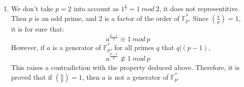 \documentclass[12pt, a4paper]{article}
\begin{document}
\begin{enumerate}
\begin{enumerate}[($\Leftarrow$)]
          \end{enumerate}
    \item We don't take $p = 2$ into account as $1^{\frac{1}{2}} = 1\ mod\ 2$, it does not representitive.\newline
          Then $p$ is an odd prime, and 2 is a factor of the order of $\mathbb{F}^{*}_p$.\newline
          Since $(\frac{a}{p}) = 1$, it is for sure that:
          $$a^{\frac{p-1}{2}} \equiv 1\ mod\ p$$
          However, if $a$ is a generator of $\mathbb{F}^{*}_p$, for all primes $q$ that $q|(p-1)$, 
          $$a^{\frac{p-1}{q}} \not\equiv 1\ mod\ p$$
          This raises a contradiction with the property deduced above.\newline
          Therefore, it is proved that if $(\frac{a}{p}) = 1$, then $a$ is not a generator of $\mathbb{F}^{*}_p$. 

\end{enumerate}
\end{document}
